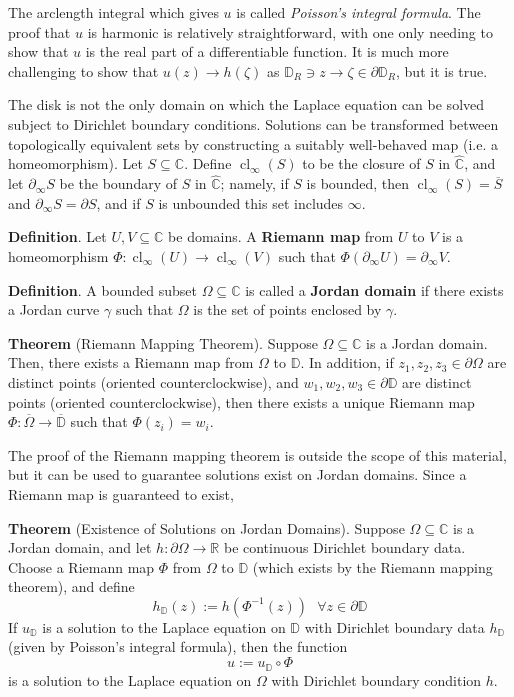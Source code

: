 \begin{framed}
        The arclength integral which gives $u$ is called \textit{Poisson's integral formula}. The proof that $u$ is harmonic is relatively straightforward, with one only needing to show that $u$ is the real part of a differentiable function. It is much more challenging to show that $u(z)\to h(\zeta)$ as $\mathbb{D}_R\ni z\to \zeta\in \partial \mathbb{D}_R$, but it is true.
\end{framed}

The disk is not the only domain on which the Laplace equation can be solved subject to Dirichlet boundary conditions. Solutions can be transformed between topologically equivalent sets by constructing a suitably well-behaved map (i.e. a homeomorphism). Let $S\subseteq\mathbb{C}$. Define $\operatorname{cl}_\infty (S)$ to be the closure of $S$ in $\hat{\mathbb{C}}$, and let $\partial_\infty S$ be the boundary of $S$ in $\hat{\mathbb{C}}$; namely, if $S$ is bounded, then $\operatorname{cl}_\infty (S) = \overline{S}$ and $\partial_\infty S = \partial S$, and if $S$ is unbounded this set includes $\infty$.

\textbf{Definition}. Let $U,V\subseteq\mathbb{C}$ be domains. A \textbf{Riemann map} from $U$ to $V$ is a homeomorphism $\Phi:\operatorname{cl}_\infty(U)\to \operatorname{cl}_\infty(V)$ such that $\Phi(\partial_\infty U) = \partial_\infty V$.

\textbf{Definition}. A bounded subset $\Omega\subseteq \mathbb{C}$ is called a \textbf{Jordan domain} if there exists a Jordan curve $\gamma$ such that $\Omega$ is the set of points enclosed by $\gamma$.

\textbf{Theorem} (Riemann Mapping Theorem). Suppose $\Omega\subseteq\mathbb{C}$ is a Jordan domain. Then, there exists a Riemann map from $\Omega$ to $\mathbb{D}$. In addition, if $z_1,z_2,z_3\in\partial\Omega$ are distinct points (oriented counterclockwise), and $w_1,w_2,w_3\in\partial \mathbb{D}$ are distinct points (oriented counterclockwise), then there exists a unique Riemann map $\Phi : \overline{\Omega}\to\overline{\mathbb{D}}$ such that $\Phi(z_i)=w_i$.

The proof of the Riemann mapping theorem is outside the scope of this material, but it can be used to guarantee solutions exist on Jordan domains. Since a Riemann map is guaranteed to exist, 

\begin{framed}
\textbf{Theorem} (Existence of Solutions on Jordan Domains). Suppose $\Omega\subseteq\mathbb{C}$ is a Jordan domain, and let $h:\partial\Omega\to \mathbb{R}$ be continuous Dirichlet boundary data. Choose a Riemann map $\Phi$ from $\Omega$ to $\mathbb{D}$ (which exists by the Riemann mapping theorem), and define \[h_\mathbb{D}(z) := h(\Phi^{-1}(z))\ \ \ \forall z\in\partial\mathbb{D}\] If $u_\mathbb{D}$ is a solution to the Laplace equation on $\mathbb{D}$ with Dirichlet boundary data $h_\mathbb{D}$ (given by Poisson's integral formula), then the function \[u:=u_\mathbb{D}\circ \Phi\] is a solution to the Laplace equation on $\Omega$ with Dirichlet boundary condition $h$.
\end{framed}

